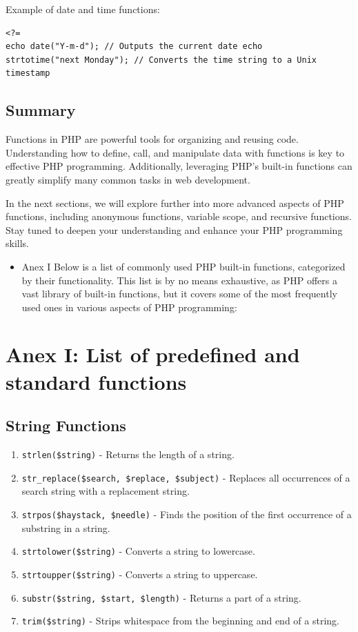 \documentclass[11pt]{article}
\begin{document}
Example of date and time functions:

\begin{verbatim}
<?=
echo date("Y-m-d"); // Outputs the current date echo
strtotime("next Monday"); // Converts the time string to a Unix
timestamp
\end{verbatim}

\subsection{Summary}
\label{sec:orgf7414ed}
Functions in PHP are powerful tools for organizing and reusing code.
Understanding how to define, call, and manipulate data with functions is
key to effective PHP programming. Additionally, leveraging PHP's
built-in functions can greatly simplify many common tasks in web
development.

In the next sections, we will explore further into more advanced aspects
of PHP functions, including anonymous functions, variable scope, and
recursive functions. Stay tuned to deepen your understanding and enhance
your PHP programming skills.

\begin{itemize}
\item Anex I Below is a list of commonly used PHP built-in functions,
categorized by their functionality. This list is by no means
exhaustive, as PHP offers a vast library of built-in functions, but it
covers some of the most frequently used ones in various aspects of PHP
programming:
\end{itemize}

\section{Anex I: List of predefined and standard functions}
\label{sec:org72f8e3a}

\subsection{String Functions}
\label{sec:org5c623a9}
\begin{enumerate}
\item \texttt{strlen(\$string)} - Returns the length of a string.
\item \texttt{str\_replace(\$search, \$replace, \$subject)} - Replaces all occurrences
of a search string with a replacement string.
\item \texttt{strpos(\$haystack, \$needle)} - Finds the position of the first
occurrence of a substring in a string.
\item \texttt{strtolower(\$string)} - Converts a string to lowercase.
\item \texttt{strtoupper(\$string)} - Converts a string to uppercase.
\item \texttt{substr(\$string, \$start, \$length)} - Returns a part of a string.
\item \texttt{trim(\$string)} - Strips whitespace from the beginning and end of a
string.
\end{enumerate}
\end{document}
